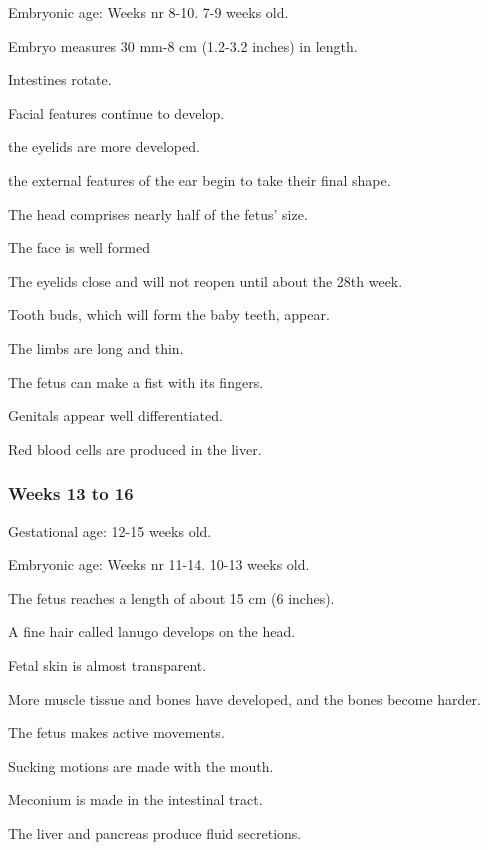 \documentclass[12pt,a4paper,onecolumn]{article}
\begin{document}
Embryonic age: Weeks nr 8-10. 7-9 weeks old.

\begin{wuxch_item}
    \item Embryo measures 30 mm-8 cm (1.2-3.2 inches) in length.
    \item Intestines rotate.
    \item Facial features continue to develop.
    \item the eyelids are more developed.
    \item the external features of the ear begin to take their final shape.
    \item The head comprises nearly half of the fetus' size.
    \item The face is well formed
    \item The eyelids close and will not reopen until about the 28th week.
    \item Tooth buds, which will form the baby teeth, appear.
    \item The limbs are long and thin.
    \item The fetus can make a fist with its fingers.
    \item Genitals appear well differentiated.
    \item Red blood cells are produced in the liver.
\end{wuxch_item}

\subsubsection{Weeks 13 to 16}

Gestational age: 12-15 weeks old.

Embryonic age: Weeks nr 11-14. 10-13 weeks old.
\begin{wuxch_item}
    \item The fetus reaches a length of about 15 cm (6 inches).
    \item A fine hair called lanugo develops on the head.
    \item Fetal skin is almost transparent.
    \item More muscle tissue and bones have developed, and the bones become harder.
    \item The fetus makes active movements.
    \item Sucking motions are made with the mouth.
    \item Meconium is made in the intestinal tract.
    \item The liver and pancreas produce fluid secretions.
\end{wuxch_item}
\end{document}
